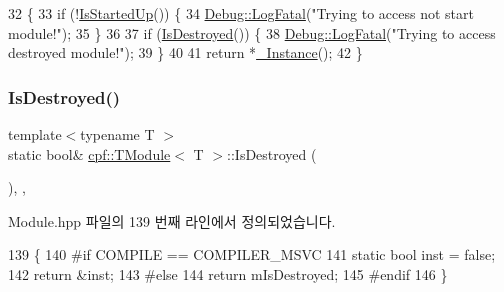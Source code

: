 \begin{DoxyCode}
32                              \{
33             \textcolor{keywordflow}{if} (!\hyperlink{classcpf_1_1_t_module_a73732afee7131dad652bf3e00c75cef9}{IsStartedUp}()) \{
34                 \hyperlink{classcpf_1_1_debug_a22849847c74bcb444922c263c9ae6183}{Debug::LogFatal}(\textcolor{stringliteral}{"Trying to access not start module!"});
35             \}
36 
37             \textcolor{keywordflow}{if} (\hyperlink{classcpf_1_1_t_module_a9f70f0a70ac59b13b7a874f82c877337}{IsDestroyed}()) \{
38                 \hyperlink{classcpf_1_1_debug_a22849847c74bcb444922c263c9ae6183}{Debug::LogFatal}(\textcolor{stringliteral}{"Trying to access destroyed module!"});
39             \}
40 
41             \textcolor{keywordflow}{return} *\hyperlink{classcpf_1_1_t_module_a06ab8af8ea6b294959937fd2bbc1e615}{\_Instance}();
42         \}
\end{DoxyCode}
\mbox{\label{classcpf_1_1_t_module_a9f70f0a70ac59b13b7a874f82c877337}} 
\subsubsection{\texorpdfstring{Is\+Destroyed()}{IsDestroyed()}}
{\footnotesize\ttfamily template$<$typename T $>$ \\
static bool\& \hyperlink{classcpf_1_1_t_module}{cpf\+::\+T\+Module}$<$ T $>$\+::Is\+Destroyed (\begin{DoxyParamCaption}{ }\end{DoxyParamCaption})\hspace{0.3cm}{\ttfamily [inline]}, {\ttfamily [static]}, {\ttfamily [private]}}



Module.\+hpp 파일의 139 번째 라인에서 정의되었습니다.


\begin{DoxyCode}
139                                    \{
140 \textcolor{preprocessor}{#if COMPILE == COMPILER\_MSVC }
141             \textcolor{keyword}{static} \textcolor{keywordtype}{bool} inst = \textcolor{keyword}{false};
142             \textcolor{keywordflow}{return} &inst;
143 \textcolor{preprocessor}{#else}
144             \textcolor{keywordflow}{return} mIsDestroyed;
145 \textcolor{preprocessor}{#endif}
146         \}
\end{DoxyCode}
\mbox{\label{classcpf_1_1_t_module_acd38943803d522ba6dcf7f0871b2f502}} 
